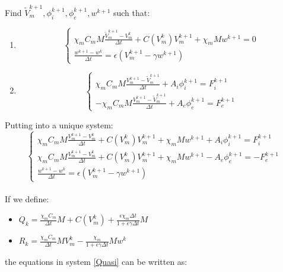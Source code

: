 \documentclass[a4paper,11pt]{article}
\begin{document}
\begin{center} Find $\tilde{V}_m^{k+1}, \phi_i^{k+1}, \phi_e^{k+1},w^{k+1}$ such that: \end{center}
\begin{enumerate}[label = \Roman*]
\item
\begin{equation*}
\begin{cases}
\chi_m C_m M \frac{\tilde{V}_m^{k+1}-V_m^k}{\Delta t} +  C(V_m^k) V_m^{k+1} + \chi_m M w^{k+1}= 0\\
\frac{w^{k+1} - w^k}{\Delta t} = \epsilon (V_m^{k+1}-\gamma w^{k+1})
\end{cases}
\end{equation*}
\item
\begin{equation*}
\begin{cases}
\chi_m C_m M \frac{V_m^{k+1}-\tilde{V}_m^{k+1}}{\Delta t} + A_i \phi_i^{k+1}= F_i^{k+1}\\
- \chi_m C_m M \frac{V_m^{k+1}-\tilde{V}_m^{k+1}}{\Delta t} + A_e \phi_e^{k+1}= F_e^{k+1}
\end{cases}
\end{equation*}
\end{enumerate}
\vspace{3mm}
Putting into a unique system:
\begin{equation}\label{Quasi}
\begin{cases}
\chi_m C_m M \frac{V_m^{k+1}-V_m^{k}}{\Delta t} + C(V_m^k) V_m^{k+1} + \chi_m M w^{k+1} + A_i \phi_i ^{k+1} = F_i^{k+1} \\
\chi_m C_m M \frac{V_m^{k+1}-V_m^{k}}{\Delta t} +  C(V_m^k) V_m^{k+1} + \chi_m M w^{k+1} - A_e \phi_e ^{k+1} =  -F_e^{k+1} \\
\frac{w^{k+1}-w^{k}}{\Delta t} = \epsilon(V_m^{k+1}-\gamma w^{k+1})
\end{cases}
\end{equation} 
\vspace{14mm} \\
If we define:
\begin{itemize}
\item $Q_k = \frac{\chi_m C_m}{\Delta t}M + C(V_m^k) + \frac{\epsilon\chi_m \Delta t}{1 + \epsilon \gamma \Delta t} M$ 
\item $R_k = \frac{\chi_mC_m}{\Delta t}MV_m^k - \frac{\chi_m}{1+\epsilon\gamma\Delta t}M w^k$
\end{itemize}
\vspace{4mm}
the equations in system \ref{Quasi} can be written as:
\end{document}
